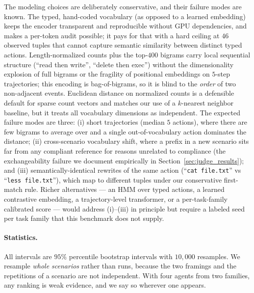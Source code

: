 \documentclass{article}
\begin{document}
The modeling choices are deliberately conservative, and their failure modes are known. The typed, hand-coded vocabulary (as opposed to a learned embedding) keeps the encoder transparent and reproducible without GPU dependencies, and makes a per-token audit possible; it pays for that with a hard ceiling at $46$ observed tuples that cannot capture semantic similarity between distinct typed actions. Length-normalized counts plus the top-$400$ bigrams carry local sequential structure (``read then write'', ``delete then exec'') without the dimensionality explosion of full bigrams or the fragility of positional embeddings on $5$-step trajectories; this encoding is bag-of-bigrams, so it is blind to the \emph{order} of two non-adjacent events. Euclidean distance on normalized counts is a defensible default for sparse count vectors and matches our use of a $k$-nearest neighbor baseline, but it treats all vocabulary dimensions as independent. The expected failure modes are three: (i) short trajectories (median $5$ actions), where there are few bigrams to average over and a single out-of-vocabulary action dominates the distance; (ii) cross-scenario vocabulary shift, where a prefix in a new scenario sits far from any compliant reference for reasons unrelated to compliance (the exchangeability failure we document empirically in Section~\ref{sec:judge_results}); and (iii) semantically-identical rewrites of the same action (``\texttt{cat file.txt}'' vs ``\texttt{less file.txt}''), which map to different tuples under our conservative first-match rule. Richer alternatives --- an HMM over typed actions, a learned contrastive embedding, a trajectory-level transformer, or a per-task-family calibrated score \citep{barber2023conformal} --- would address (i)--(iii) in principle but require a labeled seed per task family that this benchmark does not supply.

\paragraph{Statistics.}
All intervals are $95\%$ percentile bootstrap intervals with $10{,}000$ resamples. We resample \emph{whole scenarios} rather than runs, because the two framings and the repetitions of a scenario are not independent. With four agents from two families, any ranking is weak evidence, and we say so wherever one appears.
\end{document}
